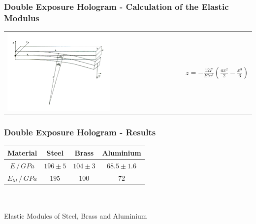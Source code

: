 \documentclass{beamer}
\newcommand{\graTwoOneB}[4][]{
	\begin{table}
		\centering
		\begin{tabular}[width=\textwidth]{c}
			\texttt{[image: ../figures/\#2.png]}\\
			\texttt{[image: ../figures/\#3.png]}\\
			#4
		\end{tabular}
	\end{table}
}
\begin{document}
\begin{frame}
	\frametitle{Double Exposure Hologram - Calculation of the Elastic Modulus}
	\begin{table}
		\centering
		\begin{tabular}[width=\textwidth]{m{6cm}m{4cm}}
			\includegraphics[width=0.6\textwidth]{../figures/balken_biegen.png}&
			$z=-\frac{12F}{Ebc^3}\left(\frac{ax^2}{2}-\frac{x^3}{6} \right)$
		\end{tabular}
	\end{table}
\end{frame}

\begin{frame}
	\frametitle{Double Exposure Hologram - Results}
	\begin{table}
		\begin{tabular}{c|ccc}
			Material&Steel&Brass&Aluminium\\\hline
			$E\,/\,\si{GPa}$&$196\pm5$&$104\pm3$&$68.5\pm1.6$\\
			$E_{lit}\,/\,\si{GPa}$\footfullcite{staats}&$195$&$100$&$72$
		\end{tabular}\\\scriptsize\ \\
		{\small Elastic Modules of Steel, Brass and Aluminium}
	\end{table}
\end{frame}
\end{document}
